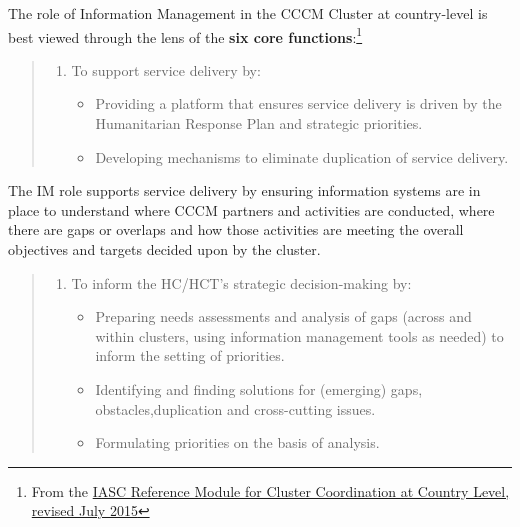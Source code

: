 \documentclass[
  a4paper,
  onecolumn,
  oneside]{book}
\providecommand{\tightlist}{%
  \setlength{\itemsep}{0pt}\setlength{\parskip}{0pt}}\usepackage{longtable,booktabs,array}
\begin{document}
The role of Information Management in the CCCM Cluster at country-level
is best viewed through the lens of the \textbf{six core
functions}:\footnote{From the
  \href{files/Reference\%20Module\%20for\%20Cluster\%20Coordination\%20at\%20Country\%20Level.pdf}{IASC
  Reference Module for Cluster Coordination at Country Level, revised
  July 2015}}

\begin{quote}
\begin{enumerate}
\def\labelenumi{\arabic{enumi}.}
\tightlist
\item
  To support service delivery by:

  \begin{itemize}
  \tightlist
  \item
    Providing a platform that ensures service delivery is driven by the
    Humanitarian Response Plan and strategic priorities.
  \item
    Developing mechanisms to eliminate duplication of service delivery.
  \end{itemize}
\end{enumerate}
\end{quote}

The IM role supports service delivery by ensuring information systems
are in place to understand where CCCM partners and activities are
conducted, where there are gaps or overlaps and how those activities are
meeting the overall objectives and targets decided upon by the cluster.

\begin{quote}
\begin{enumerate}
\def\labelenumi{\arabic{enumi}.}
\setcounter{enumi}{1}
\tightlist
\item
  To inform the HC/HCT's strategic decision-making by:

  \begin{itemize}
  \tightlist
  \item
    Preparing needs assessments and analysis of gaps (across and within
    clusters, using information management tools as needed) to inform
    the setting of priorities.
  \item
    Identifying and finding solutions for (emerging) gaps,
    obstacles,duplication and cross-cutting issues.
  \item
    Formulating priorities on the basis of analysis.
  \end{itemize}
\end{enumerate}
\end{quote}
\end{document}
